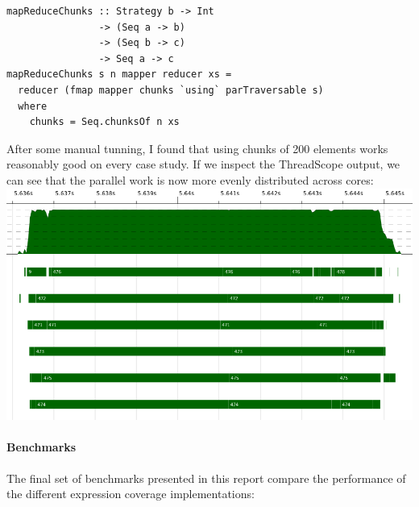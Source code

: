 \documentclass[a4paper,10pt]{article}
\begin{document}
\begin{verbatim}
mapReduceChunks :: Strategy b -> Int
                -> (Seq a -> b)
                -> (Seq b -> c)
                -> Seq a -> c
mapReduceChunks s n mapper reducer xs =
  reducer (fmap mapper chunks `using` parTraversable s)
  where
    chunks = Seq.chunksOf n xs
\end{verbatim}

After some manual tunning, I found that using chunks of 200 elements works
reasonably good on every case study.
%
If we inspect the ThreadScope output, we can see that the parallel work is now
more evenly distributed across cores:\\

\includegraphics[scale=0.3]{threadscope/ParCoverage2}\\

\paragraph{Benchmarks}

The final set of benchmarks presented in this report compare the performance of
the different expression coverage implementations:
\end{document}
